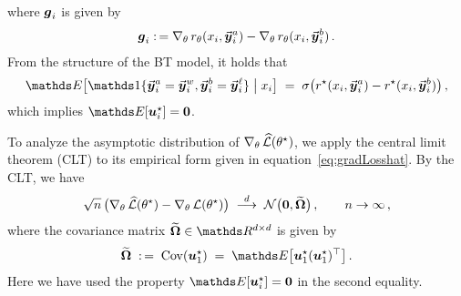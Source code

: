 	where $\boldsymbol{g}_{i}$ is given by
	\begin{align*}
		\boldsymbol{g}_{i} :\,= \nabla_{\theta} \,  r_{\theta}(x_{i}, \vec{\boldsymbol{y}}\!\,^a_{i}) - \nabla_{\theta} \,  r_{\theta}(x_{i}, \vec{\boldsymbol{y}}\!\,^b_{i}) \, .
	\end{align*}
	From the structure of the BT model, it holds that
	\begin{align*}
		\Exp\big[ \indicator \{ \responseonei{i} = \responsewini{i}, \responsetwoi{i} = \responselosei{i} \} \bigm| \prompti{i} \big] \; = \; \sigmoid \big( \rewardstar(\prompti{i}, \responseonei{i}) - \rewardstar(\prompti{i}, \responsetwoi{i}) \big) \, ,
	\end{align*}
	which implies $\Exp[\vecgstari{i}] = \veczero$.
	
	
	To analyze the asymptotic distribution of $\nabla_{\theta} \,  \widehat{\mathcal{L}}(\theta^{\star})$, we apply the central limit theorem (CLT) to its empirical form given in equation~\eqref{eq:gradLosshat}. 
	By the CLT, we have
	\begin{align}
		\label{eq:gradLoss_CLT}
		\sqrt{n} \, \big( \nabla_{\theta} \,  \widehat{\mathcal{L}}(\theta^{\star}) - \nabla_{\theta} \,  \mathcal{L}(\theta^{\star}) \big)
		\; \stackrel{d}{\longrightarrow} \; \mathcal{N}\big(\boldsymbol{0}, \widetilde{\boldsymbol{\Omega}} \big) \, ,
		\qquad n \rightarrow \infty \, ,
	\end{align}
	where the covariance matrix $\CovOptil \in \Real^{\Dim \times \Dim}$ is given by
	\begin{align*}
		\CovOptil \; \defn \; \Cov(\vecgstari{1}) \; = \; \Exp\big[ \vecgstari{1} (\vecgstari{1})^{\top} \big] \, .
	\end{align*}
	Here we have used the property $\Exp[\vecgstari{i}] = \veczero$ in the second equality.
	
